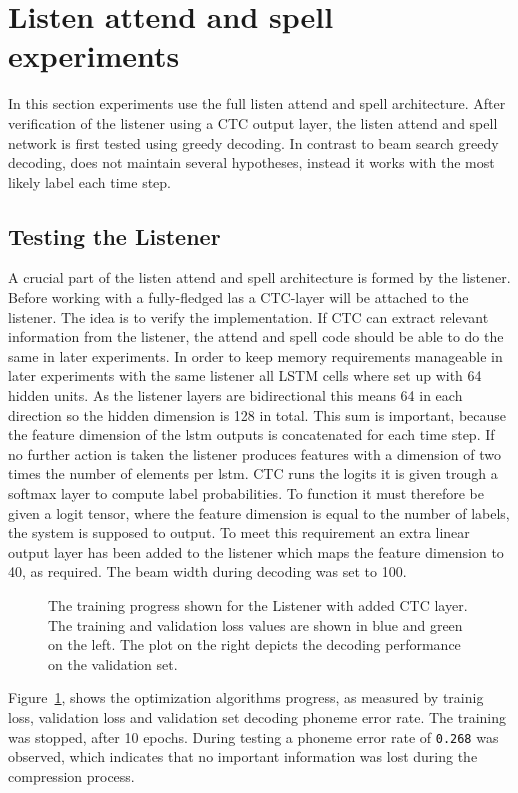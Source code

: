 \section{Listen attend and spell experiments}
In this section experiments use the full listen attend and spell architecture. After verification of the listener using a CTC output layer, the listen attend and spell network is first tested using greedy decoding. In contrast to beam search greedy decoding, does not maintain several hypotheses, instead it works with the most likely label each time step.

\subsection{Testing the Listener}
A crucial part of the listen attend and spell architecture is formed by the listener. Before working with a fully-fledged las a CTC-layer will be attached to the listener.
The idea is to verify the implementation. If CTC can extract relevant information from the listener, the attend and spell code should be able to do the same in later experiments. In order to keep memory requirements manageable in later experiments with the same listener all LSTM cells where set up with 64 hidden units. As the listener layers are bidirectional this means 64 in each direction so the hidden dimension is 128 in total. This sum is important, because the feature dimension of the lstm outputs is concatenated for each time step. If no further action is taken the listener produces features with a dimension of two times the number of elements per lstm.
CTC runs the logits it is given trough a softmax layer to compute label probabilities. To function it must therefore be given a logit tensor, where the feature dimension is equal to the number of labels, the system is supposed to output. To meet this requirement an extra linear output layer has been added to the listener which maps the feature dimension to 40, as required. The beam width during decoding was set to 100. 
\begin{figure}


\caption{The training progress shown for the Listener with added CTC layer. The training and validation loss values are shown in blue and green on the left. The plot on the right depicts the decoding performance on the validation set.}
\label{fig:listenCTC}
\end{figure}
Figure~\ref{fig:listenCTC}, shows the optimization algorithms progress, as measured by trainig loss, validation loss and validation set decoding phoneme error rate. The training was stopped, after 10 epochs. During testing a phoneme error rate of \texttt{0.268} was observed, which indicates that no important information was lost during the compression process.



